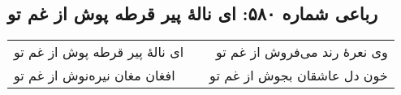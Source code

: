 \begin{center}
\section*{رباعی شماره ۵۸۰: ای نالهٔ پیر قرطه پوش از غم تو}
\label{sec:sh580}
\begin{longtable}{l p{0.5cm} r}
ای نالهٔ پیر قرطه پوش از غم تو
&&
وی نعرهٔ رند می‌فروش از غم تو
\\
افغان مغان نیره‌نوش از غم تو
&&
خون دل عاشقان بجوش از غم تو
\\
\end{longtable}
\end{center}
